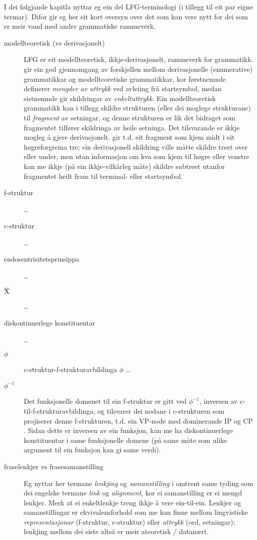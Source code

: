 \documentclass[11pt,a4paper,oneside,draft]{book}
\newcommand{\xbar}{$\rm\overline{X}$}
\begin{document}
\label{SEC:omgrepsavklaring}

I dei følgjande kapitla nyttar eg ein del LFG-terminologi (i tillegg
til eit par eigne termar). Difor gir eg her eit kort oversyn over det
som kan vere nytt for dei som er meir vand med andre grammatiske
rammeverk.

\begin{description}
\item [modellteoretisk (vs derivasjonelt)] LFG er eit modellteoretisk,
  ikkje-derivasjonelt, rammeverk for grammatikk.
  \citet{pullum2001dbm} gir ein god gjennomgang av forskjellen mellom
  derivasjonelle (enumerative) grammatikkar og modellteoretiske
  grammatikkar, kor førstnemnde definerer \emph{mengder av uttrykk} ved
  avleiing frå startsymbol, medan sistnemnde gir skildringar av
  \emph{enkeltuttrykk}. Ein modellteoretisk grammatikk kan i tillegg
  skildre strukturen (eller dei moglege strukturane) til \emph{fragment} av
  setningar, og denne strukturen er lik det bidraget som fragmentet
  tilfører skildringa av heile setninga. Det tilsvarande er ikkje
  mogleg å gjere derivasjonelt. \citet[s.~32--33]{pullum2001dbm} gir
  t.d. eit fragment som kjem midt i eit høgreforgreina tre; ein
  derivasjonell skildring ville måtte skildre treet over eller under,
  men utan informasjon om kva som kjem til høgre eller venstre kan me
  ikkje (på ein ikkje-vilkårleg måte) skildre subtreet utanfor
  fragmentet heilt fram til terminal- eller startsymbol.
\item [f-struktur] \ldots{}
\item [c-struktur] \ldots{}
\item [endosentrisitetsprinsippa] \ldots{}
\item [\xbar] \ldots{}
\item [diskontinuerlege konstituentar] \ldots{}
\item [$\phi$] c-struktur-f-strukturavbildinga $\phi$ \ldots{}
\item [$\phi^{-1}$] Det funksjonelle domenet til ein f-struktur er gitt
  ved $\phi^{-1}$, inversen av c-til-f-strukturavbildinga, og
  tilsvarer dei nodane i c-strukturen som projiserer denne
  f-strukturen, t.d. ein VP-node med dominerande IP og CP
  \citep[s.~126]{bresnan2001lfs}. Sidan dette er inversen av ein
  funksjon, kan me ha diskontinuerlege konstituentar i same
  funksjonelle domene (på same måte som ulike argument til ein
  funksjon kan gi same verdi).
\item [fraselenkjer vs frasesamanstilling] Eg nyttar her termane
  \emph{lenkjing} og \emph{samanstilling} i omtrent same tyding som dei engelske
  termane \emph{link} og \emph{alignment}, kor ei samanstilling er ei mengd
  lenkjer. Merk at ei enkeltlenkje treng ikkje å vere ein-til-ein.
  Lenkjer og samanstillingar er ekvivalensforhold som me kan finne
  mellom lingvistiske \emph{representasjonar} (f-struktur, c-struktur)
  eller \emph{uttrykk} (ord, setningar); lenkjing mellom dei siste altså er
  meir ateoretisk / datanært.
\end{description}
\end{document}

